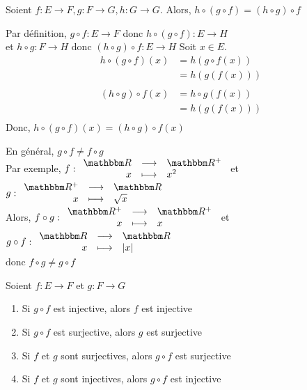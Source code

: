 \begin{prop}
	Soient $f: E\to F, g:F\to G, h: G\to G$.
	Alors, $h \circ (g \circ f) = (h \circ g) \circ f$
\end{prop}

\begin{prv}
	Par définition, $g \circ f: E \to F$ donc $h \circ (g \circ f): E \to H$\\
	et $h \circ g: F \to H$ donc $(h \circ g) \circ f: E \to H$
	Soit $x \in E$.
	\begin{align*}
		h \circ (g \circ f)(x) &= h(g \circ f(x))\\
		&= h(g(f(x))) \\
	\end{align*}
	\begin{align*}
		(h \circ g)  \circ f(x) &= h \circ g(f(x)) \\
		&= h(g(f(x))) \\
	\end{align*}
	Donc, $h \circ (g \circ f)(x) = (h \circ g) \circ f(x)$
\end{prv}

\begin{rmk}
	En général, $g \circ f \neq f \circ g$\\[5mm]
	Par exemple,  $f: \begin{array}{r c l}
		\R &\longrightarrow& \R^+ \\
		x &\longmapsto& x^2
	\end{array}$ et $g:\begin{array}{r c l}
		\R^+ &\longrightarrow& \R \\
		x &\longmapsto& \sqrt{x} 
	\end{array}$\\[5mm]
	Alors,  $f \circ g: \begin{array}{r c l}
		\R^+ &\longrightarrow& \R^+ \\
		x &\longmapsto& x
	\end{array}$ et $g \circ f:\begin{array}{r c l}
		\R &\longrightarrow& \R \\
		x &\longmapsto& \left| x \right| 
	\end{array}$\\[5mm]
	donc $f \circ g \neq g \circ f$
\end{rmk}

\begin{prop}
	Soient $f: E\to F$ et $g: F \to G$ 
	\begin{enumerate}
		\item Si $g \circ f$ est injective, alors $f$ est injective
		\item Si $g \circ f$ est surjective, alors $g$ est surjective
		\item Si $f$ et $g$ sont surjectives, alors $g \circ f$ est surjective
		\item Si $f$ et $g$ sont injectives, alors $g \circ f$ est injective
	\end{enumerate}
\end{prop}

